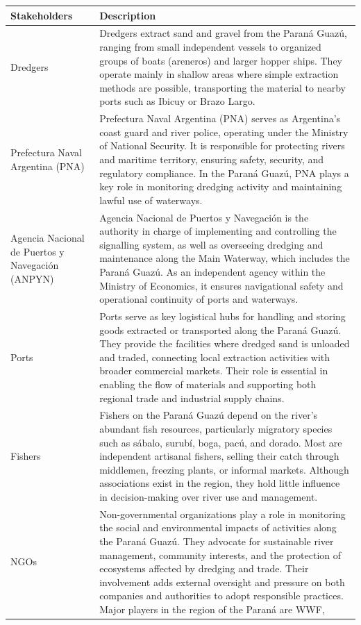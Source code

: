\begin{table}[H]
\centering
\begin{tabularx}{\linewidth}{p{3.5cm}X} %
\toprule
Stakeholders & Description \\
\midrule
Dredgers & Dredgers extract sand and gravel from the Paraná Guazú, ranging from small independent vessels to organized groups of boats (areneros) and larger hopper ships. They operate mainly in shallow areas where simple extraction methods are possible, transporting the material to nearby ports such as Ibicuy or Brazo Largo. \\
\midrule
Prefectura Naval Argentina (PNA) & Prefectura Naval Argentina (PNA) serves as Argentina’s coast guard and river police, operating under the Ministry of National Security. It is responsible for protecting rivers and maritime territory, ensuring safety, security, and regulatory compliance. In the Paraná Guazú, PNA plays a key role in monitoring dredging activity and maintaining lawful use of waterways. \\
\midrule
Agencia Nacional de Puertos y Navegación (ANPYN) & Agencia Nacional de Puertos y Navegación is the authority in charge of implementing and controlling the signalling system, as well as overseeing dredging and maintenance along the Main Waterway, which includes the Paraná Guazú. As an independent agency within the Ministry of Economics, it ensures navigational safety and operational continuity of ports and waterways. \\
\midrule
Ports & Ports serve as key logistical hubs for handling and storing goods extracted or transported along the Paraná Guazú. They provide the facilities where dredged sand is unloaded and traded, connecting local extraction activities with broader commercial markets. Their role is essential in enabling the flow of materials and supporting both regional trade and industrial supply chains. \\
\midrule
Fishers & Fishers on the Paraná Guazú depend on the river’s abundant fish resources, particularly migratory species such as sábalo, surubí, boga, pacú, and dorado. Most are independent artisanal fishers, selling their catch through middlemen, freezing plants, or informal markets. Although associations exist in the region, they hold little influence in decision-making over river use and management. \\
\midrule
NGOs & Non-governmental organizations play a role in monitoring the social and environmental impacts of activities along the Paraná Guazú. They advocate for sustainable river management, community interests, and the protection of ecosystems affected by dredging and trade. Their involvement adds external oversight and pressure on both companies and authorities to adopt responsible practices. Major players in the region of the Paraná are WWF,   \\

\end{tabularx}
\end{table}
